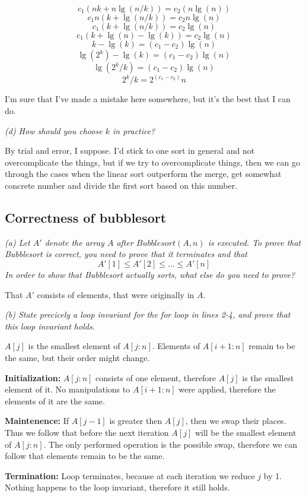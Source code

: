 \documentclass[11pt,oneside,titlepage]{book}
\begin{document}
$$c_1(nk + n\lg(n/k)) = c_2(n \lg(n))$$
$$c_1n(k + \lg(n/k)) = c_2 n\lg(n)$$
$$c_1(k + \lg(n/k)) = c_2\lg(n)$$
$$c_1(k + \lg(n) - \lg(k)) = c_2\lg(n)$$
$$k - \lg(k) = (c_1 - c_2)\lg(n)$$
$$\lg(2^k) - \lg(k) = (c_1 - c_2)\lg(n)$$
$$\lg(2^k/k) = (c_1 - c_2)\lg(n)$$
$$2^k/k = 2^{(c_1 - c_2)}n$$

I'm sure that I've made a mistake here somewhere, but it's the best that I can do.

\textit{(d) How should you choose $k$ in practice? }

By trial and error, I suppose. I'd stick to one sort in general and not overcomplicate the things,
but if we try to overcomplicate things, then we can go through the cases when the linear
sort outperform the merge, get somewhat concrete number and divide the first sort based on this
number.

\subsection{Correctness of bubblesort}

\textit{(a) Let $A'$ denote the array $A$ after $Bubblesort(A, n)$ is executed. To prove that
  Bubblesort is correct, you need to prove that it terminates and that
  $$A'[1] \leq A'[2] \leq ... \leq A'[n]$$
  In order to show that Bubblesort actually sorts, what else do you need to prove? }

That $A'$ consists of elements, that were originally in $A$.

\textit{(b) State precicely a loop invariant for the for loop in lines 2-4, and prove that
  this loop invariant holds.}

$A[j]$ is the smallest element of $A[j:n]$. Elements of $A[i + 1: n]$ remain to be the same,
but their order might change.

\textbf{Initialization: }
$A[j:n]$ consists of one element, therefore $A[j]$ is the smallest element of it. No
manipulations to $A[i + 1: n]$ were applied, therefore the elements of it are the same.

\textbf{Maintenence: }
If $A[j - 1]$ is greater then $A[j]$, then we swap their places. Thus we follow that
before the next iteration $A[j]$ will be the smallest element of $A[j:n]$. The only performed
operation is the possible swap, therefore we can follow that elements remain to be the same.

\textbf{Termination: }
Loop terminates, because at each iteration we reduce $j$ by 1. Nothing happens to the loop
invariant, therefore it still holds.
\end{document}
